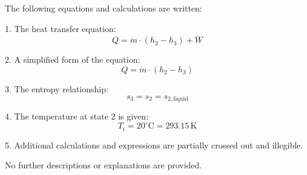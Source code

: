The following equations and calculations are written:  

1. The heat transfer equation:  
\[
Q = \dot{m} \cdot (h_2 - h_3) + \dot{W}
\]  

2. A simplified form of the equation:  
\[
Q = \dot{m} \cdot (h_2 - h_3)
\]  

3. The entropy relationship:  
\[
s_3 = s_2 = s_{2, \text{liquid}}
\]  

4. The temperature at state 2 is given:  
\[
T_i = 20^\circ\text{C} = 293.15 \, \text{K}
\]  

5. Additional calculations and expressions are partially crossed out and illegible.  

No further descriptions or explanations are provided.